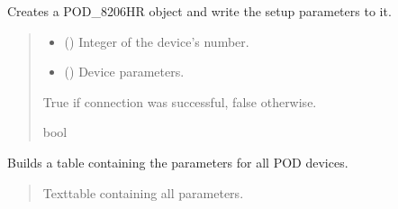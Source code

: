 \documentclass[letterpaper,10pt,english]{sphinxmanual}
\begin{document}
\begin{fulllineitems}
\begin{fulllineitems}
\label{\detokenize{Setup.SetupOneDevice:Setup.SetupOneDevice.Setup_8274D.Setup8274D._ConnectPODdevice}}
\pysigstartsignatures
{}
\pysigstopsignatures
\sphinxAtStartPar
Creates a POD\_8206HR object and write the setup parameters to it.
\begin{quote}\begin{description}
\begin{itemize}
\item {} 
\sphinxAtStartPar
{} () \textendash{} Integer of the device’s number.

\item {} 
\sphinxAtStartPar
{} () \textendash{} Device parameters.

\end{itemize}

\sphinxAtStartPar
True if connection was successful, false otherwise.

\sphinxAtStartPar
bool

\end{description}\end{quote}

\end{fulllineitems}


\begin{fulllineitems}
\label{\detokenize{Setup.SetupOneDevice:Setup.SetupOneDevice.Setup_8274D.Setup8274D._GetPODdeviceParameterTable}}
\pysigstartsignatures
{}
\pysigstopsignatures
\sphinxAtStartPar
Builds a table containing the parameters for all POD devices.
\begin{quote}\begin{description}
\sphinxAtStartPar
Texttable containing all parameters.


\end{description}
\end{quote}
\end{fulllineitems}
\end{fulllineitems}
\end{document}
